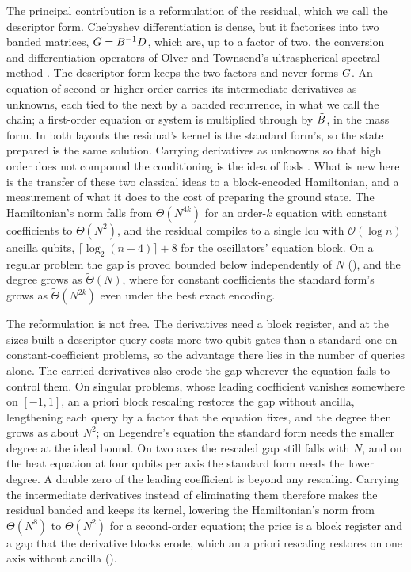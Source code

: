 The principal contribution is a reformulation of the residual, which we call the descriptor form. Chebyshev differentiation is dense, but it factorises into two banded matrices, $G=\tilde{B}^{-1}\tilde{D}$, which are, up to a factor of two, the conversion and differentiation operators of Olver and Townsend's ultraspherical spectral method \cite{olver2013}. The descriptor form keeps the two factors and never forms $G$. An equation of second or higher order carries its intermediate derivatives as unknowns, each tied to the next by a banded recurrence, in what we call the chain; a first-order equation or system is multiplied through by $\tilde{B}$, in the mass form. In both layouts the residual's kernel is the standard form's, so the state prepared is the same solution. Carrying derivatives as unknowns so that high order does not compound the conditioning is the idea of \gls{fosls} \cite{cai1994fosls}. What is new here is the transfer of these two classical ideas to a block-encoded Hamiltonian, and a measurement of what it does to the cost of preparing the ground state. The Hamiltonian's norm falls from $\Theta(N^{4k})$ for an order-$k$ equation with constant coefficients to $\Theta(N^2)$, and the residual compiles to a single \gls{lcu} with $\mathcal{O}(\log n)$ ancilla qubits, $\lceil\log_2(n+4)\rceil+8$ for the oscillators' equation block. On a regular problem the gap is proved bounded below independently of $N$ (), and the degree grows as $\tilde\Theta(N)$, where for constant coefficients the standard form's grows as $\tilde\Theta(N^{2k})$ even under the best exact encoding.

The reformulation is not free. The derivatives need a block register, and at the sizes built a descriptor query costs more two-qubit gates than a standard one on constant-coefficient problems, so the advantage there lies in the number of queries alone. The carried derivatives also erode the gap wherever the equation fails to control them. On singular problems, whose leading coefficient vanishes somewhere on $[-1,1]$, an a priori block rescaling restores the gap without ancilla, lengthening each query by a factor that the equation fixes, and the degree then grows as about $N^2$; on Legendre's equation the standard form needs the smaller degree at the ideal bound. On two axes the rescaled gap still falls with $N$, and on the heat equation at four qubits per axis the standard form needs the lower degree. A double zero of the leading coefficient is beyond any rescaling. Carrying the intermediate derivatives instead of eliminating them therefore makes the residual banded and keeps its kernel, lowering the Hamiltonian's norm from $\Theta(N^8)$ to $\Theta(N^2)$ for a second-order equation; the price is a block register and a gap that the derivative blocks erode, which an a priori rescaling restores on one axis without ancilla ().

